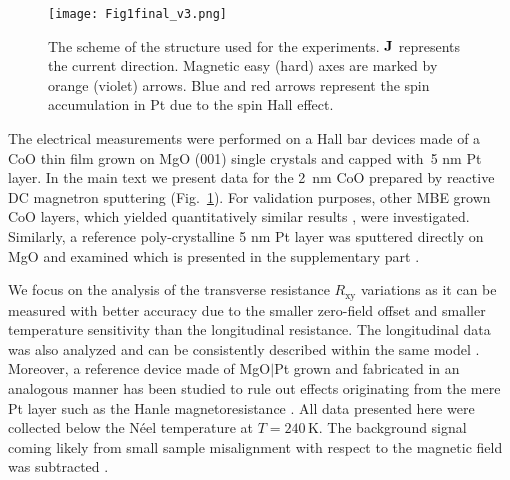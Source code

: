 \documentclass[%
 aps,
prl,
superscriptaddress,
 amsmath,amssymb,
reprint,%
]{revtex4-2}
\begin{document}
\begin{figure}
\texttt{[image: Fig1final\_v3.png]}
\caption{\label{fig:hallbar}The scheme of the structure used for the experiments. $\bf{J}$ represents the current direction. Magnetic easy (hard) axes are marked by orange (violet) arrows. Blue and red arrows represent the spin accumulation in Pt due to the spin Hall effect.}
\end{figure}
The electrical measurements were performed on a Hall bar devices made of a CoO thin film grown on MgO (001) single crystals and capped with~5 nm Pt layer. In the main text we present data for the 2~nm CoO prepared by reactive DC magnetron sputtering (Fig.~\ref{fig:hallbar}). For validation purposes, other MBE grown CoO layers, which yielded quantitatively similar results \cite{supplement}, were investigated. Similarly, a reference poly-crystalline 5 nm Pt layer was sputtered directly on MgO and examined which is presented in the supplementary part \cite{supplement}.

We focus on the analysis of the transverse resistance $R_{\text{xy}}$ variations as it can be measured with better accuracy due to the smaller zero-field offset and smaller temperature sensitivity than the longitudinal resistance. The longitudinal data was also analyzed and can be consistently described within the same model \cite{supplement}. Moreover, a reference device made of MgO$|$Pt grown and fabricated in an analogous manner has been studied to rule out effects originating from the mere Pt layer \cite{supplement} such as the Hanle magnetoresistance \cite{Velez2016}. All data presented here were collected below the N\'eel temperature at $T=240\,\text{K}$. The background signal coming likely from small sample misalignment with respect to the magnetic field was subtracted \cite{supplement}.
\end{document}
